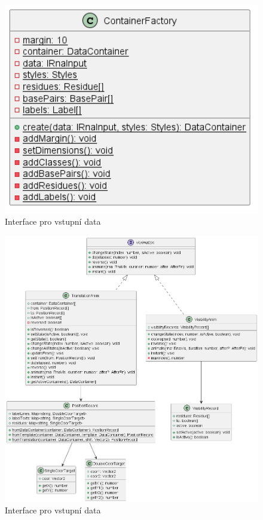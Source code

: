 \begin{figure}[H]
  \centering
  \includegraphics[width=145mm]{../img/containerFactory.png}
  \caption{Interface pro vstupní data}
\end{figure}

\begin{figure}[H]
  \centering
  \includegraphics[width=145mm]{../img/animations.png}
  \caption{Interface pro vstupní data}
\end{figure}


